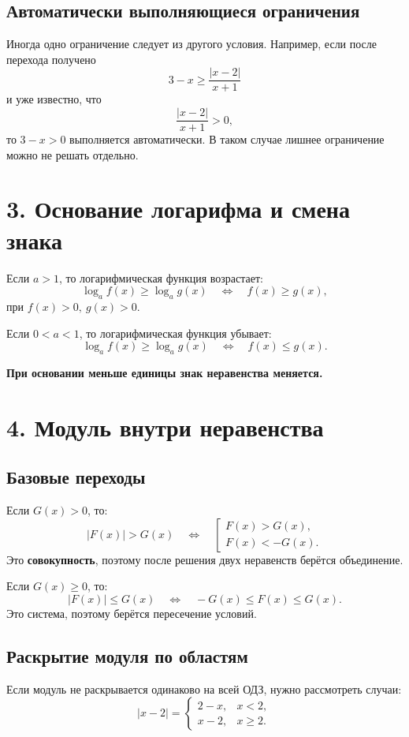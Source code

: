 \documentclass[a4paper,12pt]{article}
\newcommand{\important}[1]{\textcolor{darkaccent}{\textbf{#1}}}
\begin{document}
\subsection*{Автоматически выполняющиеся ограничения}

Иногда одно ограничение следует из другого условия. Например, если после перехода получено
\[
3-x\ge \frac{|x-2|}{x+1}
\]
и уже известно, что
\[
\frac{|x-2|}{x+1}>0,
\]
то \(3-x>0\) выполняется автоматически. В таком случае лишнее ограничение можно не решать отдельно.

\section*{3. Основание логарифма и смена знака}

Если \(a>1\), то логарифмическая функция возрастает:
\[
\log_a f(x)\ge \log_a g(x)
\quad \Longleftrightarrow \quad
f(x)\ge g(x),
\]
при \(f(x)>0,\ g(x)>0\).

Если \(0<a<1\), то логарифмическая функция убывает:
\[
\log_a f(x)\ge \log_a g(x)
\quad \Longleftrightarrow \quad
f(x)\le g(x).
\]

\important{При основании меньше единицы знак неравенства меняется.}

\section*{4. Модуль внутри неравенства}

\subsection*{Базовые переходы}

Если \(G(x)>0\), то:
\[
|F(x)|>G(x)
\quad \Longleftrightarrow \quad
\left[
\begin{array}{l}
F(x)>G(x),\\
F(x)<-G(x).
\end{array}
\right.
\]
Это \important{совокупность}, поэтому после решения двух неравенств берётся объединение.

Если \(G(x)\ge0\), то:
\[
|F(x)|\le G(x)
\quad \Longleftrightarrow \quad
-G(x)\le F(x)\le G(x).
\]
Это система, поэтому берётся пересечение условий.

\subsection*{Раскрытие модуля по областям}

Если модуль не раскрывается одинаково на всей ОДЗ, нужно рассмотреть случаи:
\[
|x-2|=
\begin{cases}
2-x, & x<2,\\
x-2, & x\ge2.
\end{cases}
\]
\end{document}
